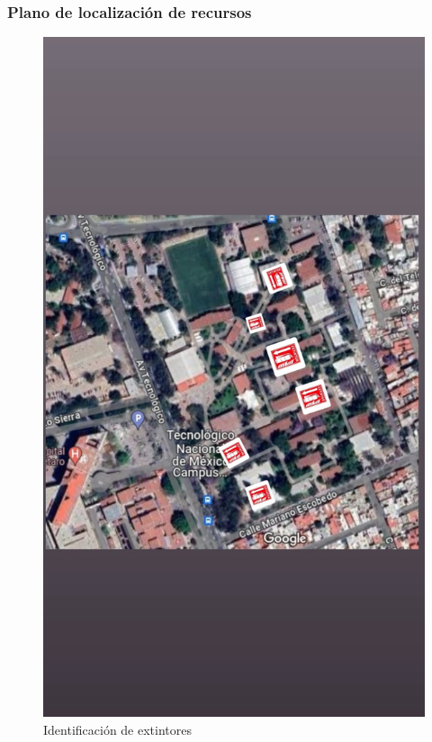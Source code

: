 \subsubsection{Plano de localización de recursos}
%
%
\begin{figure}[H]
        \centering
        \includegraphics[trim = {30mm 120mm 30mm 120mm},clip,scale=0.2]{10/Img/recursos.jpg}
        \caption{Identificación de extintores}
        \label{Recursos}
    \end{figure}
%
%
